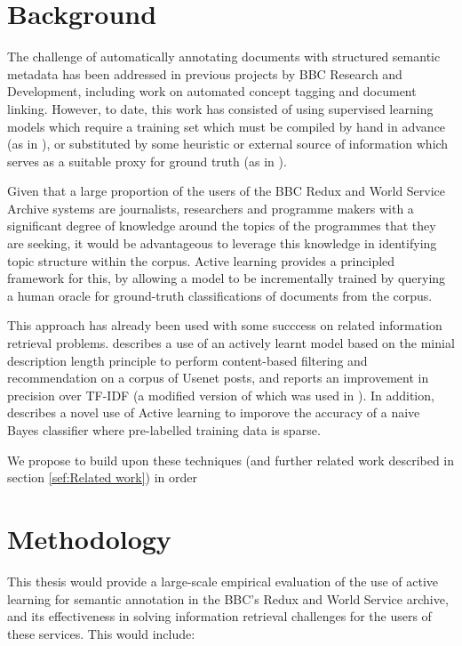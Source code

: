 \documentclass[a4paper, 11pt]{article}
\begin{document}
\section{Background}
\label{sec:Background}
The challenge of automatically annotating documents with structured semantic metadata has been addressed in previous projects by BBC Research and Development, including work on automated concept tagging and  document linking. However, to date, this work has consisted of using supervised learning models which require a training set which must be compiled by hand in advance (as in \cite{Raimond2013}), or substituted by some heuristic or external source of information which serves as a suitable proxy for ground truth (as in \cite{Raimond2012}).

Given that a large proportion of the users of the BBC Redux and World Service Archive systems are journalists, researchers and programme makers with a significant degree of knowledge around the topics of the programmes that they are seeking, it would be advantageous to leverage this knowledge in identifying topic structure within the corpus. Active learning provides a principled framework for this, by allowing a model to be incrementally trained by querying a human oracle for ground-truth classifications of documents from the corpus.

This approach has already been used with some succcess on related information retrieval problems. \cite{Lang1995} describes a use of an actively learnt model based on the minial description length principle to perform content-based filtering and recommendation on a corpus of Usenet posts, and reports an improvement in precision over TF-IDF (a modified version of which was used in \cite{Raimond2012}). In addition, \cite{McCallum1998} describes a novel use of Active learning to imporove the accuracy of a naive Bayes classifier where pre-labelled training data is sparse.

We propose to build upon these techniques (and further related work described in section \ref{sef:Related work}) in order
\section{Methodology}

This thesis would provide a large-scale empirical evaluation of the use of active learning for semantic annotation in the BBC's Redux and World Service archive, and its effectiveness in solving information retrieval challenges for the users of these services. This would include:
\end{document}
